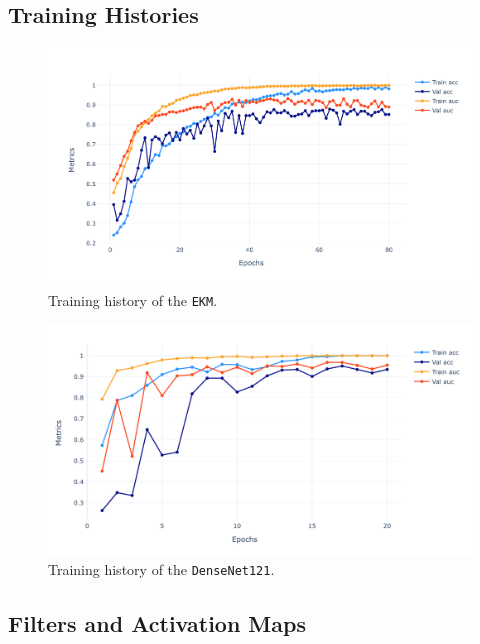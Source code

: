 \documentclass[aps,twocolumn,secnumarabic,nobalancelastpage,amsmath,amssymb,
nofootinbib]{revtex4}
\begin{document}
\subsection*{Training Histories}\label{training-histories}

\begin{figure}[h!]
	\centering
	\includegraphics[width=0.8\linewidth]{Images/TrainingHistoryEKM}
	\caption{Training history of the \texttt{EKM}.}
	\label{fig:traininghistoryekm}
\end{figure}

\begin{figure}[h!]
	\centering
	\includegraphics[width=0.8\linewidth]{Images/TrainingHistoryDenseNet121}
	\caption{Training history of the \texttt{DenseNet121}.}
	\label{fig:traininghistorydensenet121}
\end{figure}

\newpage

\subsection*{Filters and Activation Maps}
\end{document}
